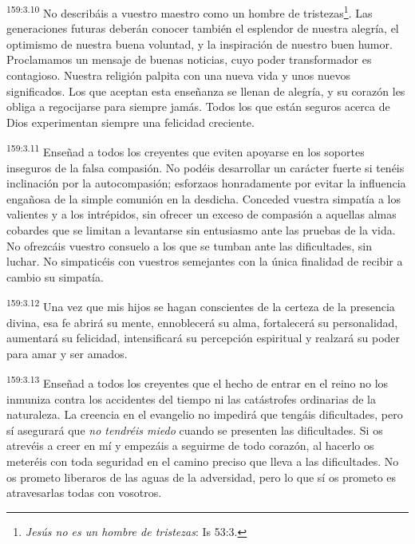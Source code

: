 \par 
\textsuperscript{159:3.10} No describáis a vuestro maestro como un hombre de tristezas\footnote{\textit{Jesús no es un hombre de tristezas}: Is 53:3.}. Las generaciones futuras deberán conocer también el esplendor de nuestra alegría, el optimismo de nuestra buena voluntad, y la inspiración de nuestro buen humor. Proclamamos un mensaje de buenas noticias, cuyo poder transformador es contagioso. Nuestra religión palpita con una nueva vida y unos nuevos significados. Los que aceptan esta enseñanza se llenan de alegría, y su corazón les obliga a regocijarse para siempre jamás. Todos los que están seguros acerca de Dios experimentan siempre una felicidad creciente.

\par 
\textsuperscript{159:3.11} Enseñad a todos los creyentes que eviten apoyarse en los soportes inseguros de la falsa compasión. No podéis desarrollar un carácter fuerte si tenéis inclinación por la autocompasión; esforzaos honradamente por evitar la influencia engañosa de la simple comunión en la desdicha. Conceded vuestra simpatía a los valientes y a los intrépidos, sin ofrecer un exceso de compasión a aquellas almas cobardes que se limitan a levantarse sin entusiasmo ante las pruebas de la vida. No ofrezcáis vuestro consuelo a los que se tumban ante las dificultades, sin luchar. No simpaticéis con vuestros semejantes con la única finalidad de recibir a cambio su simpatía.

\par 
\textsuperscript{159:3.12} Una vez que mis hijos se hagan conscientes de la certeza de la presencia divina, esa fe abrirá su mente, ennoblecerá su alma, fortalecerá su personalidad, aumentará su felicidad, intensificará su percepción espiritual y realzará su poder para amar y ser amados.

\par 
\textsuperscript{159:3.13} Enseñad a todos los creyentes que el hecho de entrar en el reino no los inmuniza contra los accidentes del tiempo ni las catástrofes ordinarias de la naturaleza. La creencia en el evangelio no impedirá que tengáis dificultades, pero sí asegurará que \textit{no tendréis miedo} cuando se presenten las dificultades. Si os atrevéis a creer en mí y empezáis a seguirme de todo corazón, al hacerlo os meteréis con toda seguridad en el camino preciso que lleva a las dificultades. No os prometo liberaros de las aguas de la adversidad, pero lo que sí os prometo es atravesarlas todas con vosotros.

